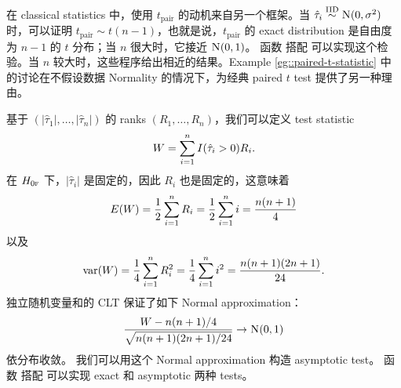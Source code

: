 在 classical statistics 中，使用 $t_\text{pair}$ 的动机来自另一个框架。当 $\hat{\tau}_i \stackrel{\textup{IID}}{\sim} \textsc{N}(0, \sigma^2)$ 时，可以证明 $t_\text{pair} \sim t(n-1)$，也就是说，$t_\text{pair} $ 的 exact distribution 是自由度为 $n-1$ 的 $t$ 分布；当 $n$ 很大时，它接近 $\N01$。 函数  搭配  可以实现这个检验。当 $n$ 较大时，这些程序给出相近的结果。Example  \ref{eg::paired-t-statistic} 中的讨论在不假设数据 Normality 的情况下，为经典 paired $t$ test 提供了另一种理由。

 
 
 

 
 
  \begin{example}
 \label{eg::mpe-sign-rank}
基于 $( | \hat{\tau}_1| , \ldots, | \hat{\tau}_n| )$ 的 ranks $(R_1, \ldots, R_n)$，我们可以定义 test statistic
$$
W = \sum_{i=1}^n  I( \hat{\tau}_i > 0 ) R_i. 
$$
在 $H_{0\textsc{f}}$ 下，$| \hat{\tau}_i|$ 是固定的，因此 $R_i$ 也是固定的，这意味着
$$
E(W) = \frac{1}{2} \sum_{i=1}^n R_i = \frac{1}{2} \sum_{i=1}^n i = \frac{n(n+1)}{4}
$$
以及
$$
\textup{var}(W) = \frac{1}{4} \sum_{i=1}^n R_i^2 = \frac{1}{4} \sum_{i=1}^n i^2 = \frac{n(n+1)(2n+1)}{24}. 
$$
独立随机变量和的 CLT 保证了如下 Normal approximation：
$$
\frac{W - n(n+1)/4}{ \sqrt{n(n+1)(2n+1) / 24    } } \rightarrow \N01
$$
依分布收敛。
我们可以用这个 Normal approximation 构造 asymptotic test。 函数  搭配  可以实现 exact 和 asymptotic 两种 tests。
 \end{example}
 
 
 
